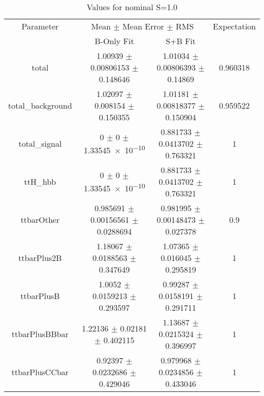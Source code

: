 \begin{table}
\centering
\caption{Values for nominal S=1.0}
\begin{tabular}{cccc}
\toprule
Parameter & \multicolumn{2}{c}{Mean $\pm$ Mean Error $\pm$ RMS} & Expectation\\
 & B-Only Fit & S+B Fit & \\
\midrule
total & \num{1.00939} $\pm$ \num{0.00806153} $\pm$ \num{0.148646} & \num{1.01034} $\pm$ \num{0.00806393} $\pm$ \num{0.14869} & \num{0.960318}\\
total\_background & \num{1.02097} $\pm$ \num{0.008154} $\pm$ \num{0.150355} & \num{1.01181} $\pm$ \num{0.00818377} $\pm$ \num{0.150904} & \num{0.959522}\\
total\_signal & \num{0} $\pm$ \num{0} $\pm$ \num{1.33545e-10} & \num{0.881733} $\pm$ \num{0.0413702} $\pm$ \num{0.763321} & \num{1}\\
ttH\_hbb & \num{0} $\pm$ \num{0} $\pm$ \num{1.33545e-10} & \num{0.881733} $\pm$ \num{0.0413702} $\pm$ \num{0.763321} & \num{1}\\
ttbarOther & \num{0.985691} $\pm$ \num{0.00156561} $\pm$ \num{0.0288694} & \num{0.981995} $\pm$ \num{0.00148473} $\pm$ \num{0.027378} & \num{0.9}\\
ttbarPlus2B & \num{1.18067} $\pm$ \num{0.0188563} $\pm$ \num{0.347649} & \num{1.07365} $\pm$ \num{0.016045} $\pm$ \num{0.295819} & \num{1}\\
ttbarPlusB & \num{1.0052} $\pm$ \num{0.0159213} $\pm$ \num{0.293597} & \num{0.99287} $\pm$ \num{0.0158191} $\pm$ \num{0.291711} & \num{1}\\
ttbarPlusBBbar & \num{1.22136} $\pm$ \num{0.02181} $\pm$ \num{0.402115} & \num{1.13687} $\pm$ \num{0.0215324} $\pm$ \num{0.396997} & \num{1}\\
ttbarPlusCCbar & \num{0.92397} $\pm$ \num{0.0232686} $\pm$ \num{0.429046} & \num{0.979968} $\pm$ \num{0.0234856} $\pm$ \num{0.433046} & \num{1}\\
\bottomrule
\end{tabular}
\end{table}